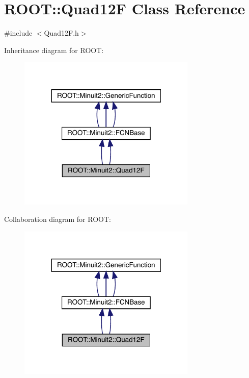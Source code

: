 \hypertarget{classROOT_1_1Minuit2_1_1Quad12F}{}\section{R\+O\+OT\+:\+:Quad12F Class Reference}
\label{classROOT_1_1Minuit2_1_1Quad12F}


{\ttfamily \#include $<$Quad12\+F.\+h$>$}



Inheritance diagram for R\+O\+OT\+:
\nopagebreak
\begin{figure}[H]
\begin{center}
\leavevmode
\includegraphics[width=240pt]{d2/db0/classROOT_1_1Minuit2_1_1Quad12F__inherit__graph}
\end{center}
\end{figure}


Collaboration diagram for R\+O\+OT\+:
\nopagebreak
\begin{figure}[H]
\begin{center}
\leavevmode
\includegraphics[width=240pt]{d7/dbe/classROOT_1_1Minuit2_1_1Quad12F__coll__graph}
\end{center}
\end{figure}
